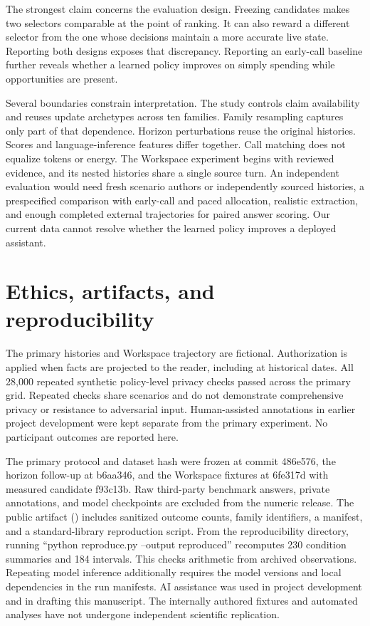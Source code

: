 \documentclass[
  11pt,
]{article}
\begin{document}
The strongest claim concerns the evaluation design. Freezing candidates
makes two selectors comparable at the point of ranking. It can also
reward a different selector from the one whose decisions maintain a more
accurate live state. Reporting both designs exposes that discrepancy.
Reporting an early-call baseline further reveals whether a learned
policy improves on simply spending while opportunities are present.

Several boundaries constrain interpretation. The study controls claim
availability and reuses update archetypes across ten families. Family
resampling captures only part of that dependence. Horizon perturbations
reuse the original histories. Scores and language-inference features
differ together. Call matching does not equalize tokens or energy. The
Workspace experiment begins with reviewed evidence, and its nested
histories share a single source turn. An independent evaluation would
need fresh scenario authors or independently sourced histories, a
prespecified comparison with early-call and paced allocation, realistic
extraction, and enough completed external trajectories for paired answer
scoring. Our current data cannot resolve whether the learned policy
improves a deployed assistant.

\section{Ethics, artifacts, and
reproducibility}\label{ethics-artifacts-and-reproducibility}

The primary histories and Workspace trajectory are fictional.
Authorization is applied when facts are projected to the reader,
including at historical dates. All 28,000 repeated synthetic
policy-level privacy checks passed across the primary grid. Repeated
checks share scenarios and do not demonstrate comprehensive privacy or
resistance to adversarial input. Human-assisted annotations in earlier
project development were kept separate from the primary experiment. No
participant outcomes are reported here.

The primary protocol and dataset hash were frozen at commit 486e576, the
horizon follow-up at b6aa346, and the Workspace fixtures at 6fe317d with
measured candidate f93c13b. Raw third-party benchmark answers, private
annotations, and model checkpoints are excluded from the numeric
release. The public artifact () includes sanitized outcome counts, family identifiers, a
manifest, and a standard-library reproduction script. From the
reproducibility directory, running ``python reproduce.py --output
reproduced'' recomputes 230 condition summaries and 184 intervals. This
checks arithmetic from archived observations. Repeating model inference
additionally requires the model versions and local dependencies in the
run manifests. AI assistance was used in project development and in
drafting this manuscript. The internally authored fixtures and automated
analyses have not undergone independent scientific replication.
\end{document}

